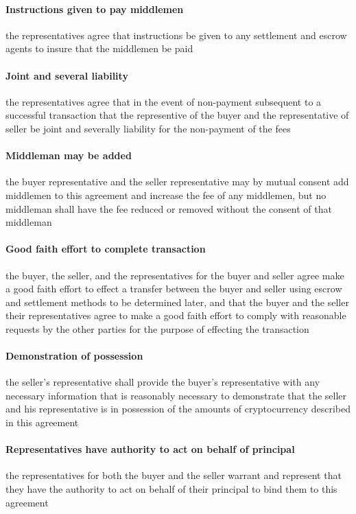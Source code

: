 \documentclass[10pt]{article}
\begin{document}
\paragraph{Instructions given to pay middlemen} the
representatives agree that instructions be given to any settlement and
escrow agents to insure that the middlemen be paid

\paragraph{Joint and several liability} the representatives agree that
in the event of non-payment subsequent to a successful transaction
that the representive of the buyer and the representative of seller be
joint and severally liability for the non-payment of the fees

\paragraph{Middleman may be added} the buyer representative and the
seller representative may by mutual consent add middlemen to this
agreement and increase the fee of any middlemen, but no middleman
shall have the fee reduced or removed without the consent of that
middleman

\paragraph{Good faith effort to complete transaction} the buyer,
the seller, and the representatives for the buyer and seller agree
make a good faith effort to effect a transfer between the buyer and
seller using escrow and settlement methods to be determined later, and
that the buyer and the seller their representatives agree to make a
good faith effort to comply with reasonable requests by the other
parties for the purpose of effecting the transaction

\paragraph{Demonstration of possession} the seller’s
representative shall provide the buyer’s representative with any
necessary information that is reasonably necessary to demonstrate that
the seller and his representative is in possession of the amounts of
cryptocurrency described in this agreement

\paragraph{Representatives have authority to act on behalf of
  principal} the representatives for both the buyer and the seller
warrant and represent that they have the authority to act on behalf of
their principal to bind them to this agreement
\end{document}
